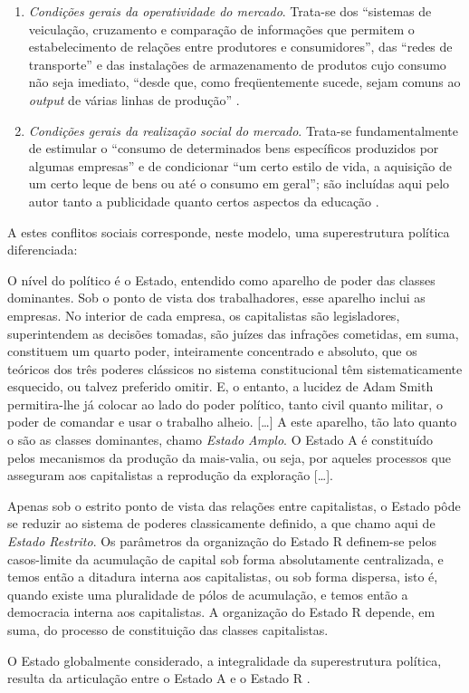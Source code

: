 \begin{enumerate}
\item \textit{Condições gerais da operatividade do mercado}. Trata-se dos ``sistemas de veiculação, cruzamento e comparação de informações que permitem o estabelecimento de relações entre produtores e consumidores'', das ``redes de transporte'' e das instalações de armazenamento de produtos cujo consumo não seja imediato, ``desde que, como freqüentemente sucede, sejam comuns ao \textit{output }de várias linhas de produção''  \cite[p.~161]{BERNARDO1991}.
\item \textit{Condições gerais da realização social do mercado}. Trata-se fundamentalmente de estimular o ``consumo de determinados bens específicos produzidos por algumas empresas'' e de condicionar ``um certo estilo de vida, a aquisição de um certo leque de bens ou até o consumo em geral''; são incluídas aqui pelo autor tanto a publicidade quanto certos aspectos da educação \cite[p.~161]{BERNARDO1991}.
\end{enumerate}

A estes conflitos sociais corresponde, neste modelo, uma superestrutura política diferenciada:

\begin{citacao}
O nível do político é o Estado, entendido como aparelho de poder das classes dominantes. Sob o ponto de vista dos trabalhadores, esse aparelho inclui as empresas. No interior de cada empresa, os capitalistas são legisladores, superintendem as decisões tomadas, são juízes das infrações cometidas, em suma, constituem um quarto poder, inteiramente concentrado e absoluto, que os teóricos dos três poderes clássicos no sistema constitucional têm sistematicamente esquecido, ou talvez preferido omitir. E, o entanto, a lucidez de Adam Smith permitira-lhe já colocar ao lado do poder  político, tanto civil quanto militar, o poder de comandar e usar o trabalho alheio. [\dots] A este aparelho, tão lato quanto o são as classes dominantes, chamo \textit{Estado Amplo}. O Estado A é constituído pelos mecanismos da produção da mais-valia, ou seja, por aqueles processos que asseguram aos capitalistas a reprodução da exploração [\dots]. 

Apenas sob o estrito ponto de vista das relações entre capitalistas, o Estado pôde se reduzir ao sistema de poderes classicamente definido, a que chamo aqui de \textit{Estado Restrito}. Os parâmetros da organização do Estado R definem-se pelos casos-limite da acumulação de capital sob forma absolutamente centralizada, e temos então a ditadura interna aos capitalistas, ou sob forma dispersa, isto é, quando existe uma pluralidade de pólos de acumulação, e temos então a democracia interna aos capitalistas. A organização do Estado R depende, em suma, do processo de constituição das classes capitalistas.

O Estado globalmente considerado, a integralidade da superestrutura política, resulta da articulação entre o Estado A e o Estado R \cite[p.~162-163]{BERNARDO1991}.
\end{citacao}

